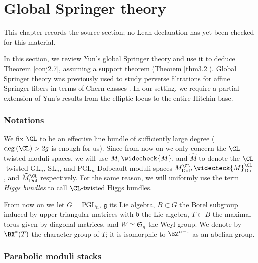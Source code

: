 \chapter{Global Springer theory}
\label{pw-conjecture-gl-n-chapter-04}

\begin{remark}
\label{pw-conjecture-gl-n-chapter-04-source}
This chapter records the source section; no Lean declaration has yet been checked for this material.
\notready
\end{remark}

In this section, we review Yun's global Springer theory \cite{Yun1,Yun2,Yun3} and use it to deduce Theorem \ref{conj2.7}, assuming a support theorem (Theorem \ref{thm3.2}). Global Springer theory was previously used to study perverse filtrations for affine Springer fibers in terms of Chern classes \cite{OY,OY2}.  In our setting, we require a partial extension of Yun's results from the elliptic locus to the entire Hitchin base.

\subsection{Notations}
We fix $\CL$ to be an effective line bundle of sufficiently large degree
($\mathrm{deg}\left(\CL\right)> 2g$ is enough for us).
 Since from now on we only concern the $\CL$-twisted moduli spaces, we will use $M, \widecheck{M}$, and $\widehat{M}$ to denote the $\CL$-twisted $\mathrm{GL}_n$, $\mathrm{SL}_n$, and $\mathrm{PGL}_n$ Dolbeault moduli spaces $M^\CL_{\mathrm{Dol}}, \widecheck{M}^\CL_{\mathrm{Dol}}$, and $\widehat{M}^\CL_{\mathrm{Dol}}$ respectively. For the same reason, we will uniformly use the term \emph{Higgs bundles} to call $\CL$-twisted Higgs bundles.

From now on we let $G = \mathrm{PGL}_n$, $\mathfrak{g}$ its Lie algebra, $B \subset G$ the Borel subgroup induced by upper triangular matrices with $\mathfrak{b}$ the Lie algebra, $T\subset B$ the maximal torus given by diagonal matrices, and $W \simeq \mathfrak{S}_n$ the Weyl group. We denote by $\BX^*(T)$ the character group of $T$; it is isomorphic to $\BZ^{n-1}$ as an abelian group.




\subsection{Parabolic moduli stacks}

